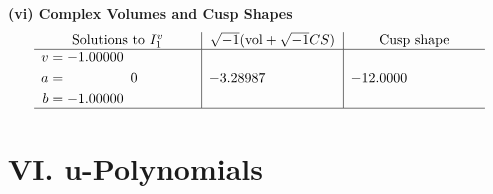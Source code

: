 \documentclass[1p]{elsarticle_modified}
\theoremstyle{definition}
\newcommand{\I}{\sqrt{-1}}
\begin{document}
\newpage\flushleft \textbf{(vi) Complex Volumes and Cusp Shapes}
$$\begin{array}{c|c|c}  
\text{Solutions to }I^v_{1}& \I (\text{vol} + \sqrt{-1}CS) & \text{Cusp shape}\\
 \hline 
\begin{aligned}
v &= -1.00000\phantom{ +0.000000I} \\
a &= \phantom{-0.000000 } 0 \\
b &= -1.00000\phantom{ +0.000000I}\end{aligned}
 & -3.28987\phantom{ +0.000000I} & -12.0000\phantom{ +0.000000I}\\
 \hline 
 \end{array}$$\newpage
\newpage\renewcommand{\arraystretch}{1}
\centering \section*{ VI. u-Polynomials}
\end{document}

